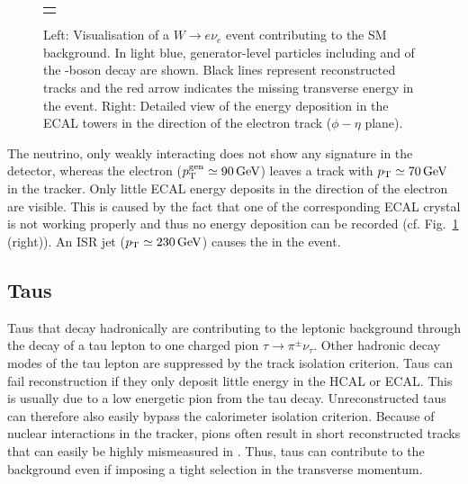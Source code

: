 \begin{figure}[!t]
\begin{tabular}{c}
\begin{minipage}[c]{0.49\textwidth}
  \end{minipage} 
  \end{tabular}
 \caption{Left: Visualisation of a $W\rightarrow e\nu_e$ event contributing to the SM background. 
          In light blue, generator-level particles including \lel and \nue of the \W-boson decay are shown. 
          Black lines represent reconstructed tracks and the red arrow indicates the missing transverse energy in the event.
          Right: Detailed view of the energy deposition in the ECAL towers in the direction of the electron track ($\phi - \eta$ plane).}
  \label{fig:LostElectron}
\end{figure}
The neutrino, only weakly interacting does not show any signature in the detector, whereas the electron ($p^{\text{gen}}_{\text{T}}\simeq 90\,\text{Ge}\kern-0.06667em\text{V}$) leaves a track with $p_{\text{T}}\simeq 70\,\text{Ge}\kern-0.06667em\text{V}$ in the tracker. 
Only little ECAL energy deposits in the direction of the electron are visible. 
This is caused by the fact that one of the corresponding ECAL crystal is not working properly and thus no energy deposition can be recorded (cf. Fig.~\ref{fig:LostElectron} (right)).
An ISR jet ($p_{\text{T}}\simeq 230\,\text{Ge}\kern-0.06667em\text{V}$) causes the \met in the event. 
 

\subsection*{Taus}
Taus that decay hadronically are contributing to the leptonic background through the decay of a tau lepton to one charged pion $\tau\rightarrow\pi^{\pm}\nu_{\tau}$.
Other hadronic decay modes of the tau lepton are suppressed by the track isolation criterion.
Taus can fail reconstruction if they only deposit little energy in the HCAL or ECAL.
This is usually due to a low energetic pion from the tau decay.
Unreconstructed taus can therefore also easily bypass the calorimeter isolation criterion.
Because of nuclear interactions in the tracker, pions often result in short reconstructed tracks that can easily be highly mismeasured in \pt.
Thus, taus can contribute to the background even if imposing a tight selection in the transverse momentum.

